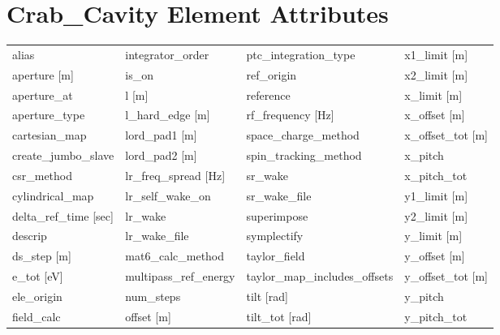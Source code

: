  \section{Crab_Cavity Element Attributes}
 \label{s:list.crab.cavity}
 
 \begin{tabular}{llll} \toprule
alias                          & integrator_order               & ptc_integration_type           & x1_limit [m]                   \\
aperture [m]                   & is_on                          & ref_origin                     & x2_limit [m]                   \\
aperture_at                    & l [m]                          & reference                      & x_limit [m]                    \\
aperture_type                  & l_hard_edge [m]                & rf_frequency [Hz]              & x_offset [m]                   \\
cartesian_map                  & lord_pad1 [m]                  & space_charge_method            & x_offset_tot [m]               \\
create_jumbo_slave             & lord_pad2 [m]                  & spin_tracking_method           & x_pitch                        \\
csr_method                     & lr_freq_spread [Hz]            & sr_wake                        & x_pitch_tot                    \\
cylindrical_map                & lr_self_wake_on                & sr_wake_file                   & y1_limit [m]                   \\
delta_ref_time [sec]           & lr_wake                        & superimpose                    & y2_limit [m]                   \\
descrip                        & lr_wake_file                   & symplectify                    & y_limit [m]                    \\
ds_step [m]                    & mat6_calc_method               & taylor_field                   & y_offset [m]                   \\
e_tot [eV]                     & multipass_ref_energy           & taylor_map_includes_offsets    & y_offset_tot [m]               \\
ele_origin                     & num_steps                      & tilt [rad]                     & y_pitch                        \\
field_calc                     & offset [m]                     & tilt_tot [rad]                 & y_pitch_tot                    \\

\end{tabular}
